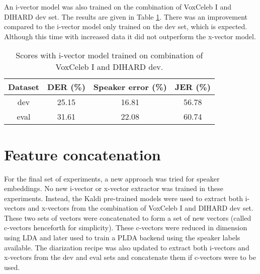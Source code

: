 		An i-vector model was also trained on the combination of VoxCeleb I and DIHARD dev set. The results are given in Table \ref{table-voxdev-ivec}. There was an improvement compared to the i-vector model only trained on the dev set, which is expected. Although this time with increased data it did not outperform the x-vector model.
		
		\begin{table}[h]
			\centering
			\begin{tabular}{|c|c|c|c|}
				\hline
				Dataset & DER (\%) & Speaker error (\%) & JER (\%) \\
				\hline
				dev & 25.15 & 16.81 & 56.78 \\
				\hline
				eval & 31.61 & 22.08 & 60.74 \\
				\hline
			\end{tabular}
			\caption{Scores with i-vector model trained on combination of VoxCeleb I and DIHARD dev.}
			\label{table-voxdev-ivec}
		\end{table}
		
	\section{Feature concatenation}
	For the final set of experiments, a new approach was tried for speaker embeddings. No new i-vector or x-vector extractor was trained in these experiments. Instead, the Kaldi pre-trained models were used to extract both i-vectors and x-vectors from the combination of VoxCeleb I and DIHARD dev set. These two sets of vectors were concatenated to form a set of new vectors (called c-vectors henceforth for simplicity). These c-vectors were reduced in dimension using LDA and later used to train a PLDA backend using the speaker labels available. The diarization recipe was also updated to extract both i-vectors and x-vectors from the dev and eval sets and concatenate them if c-vectors were to be used.
	
